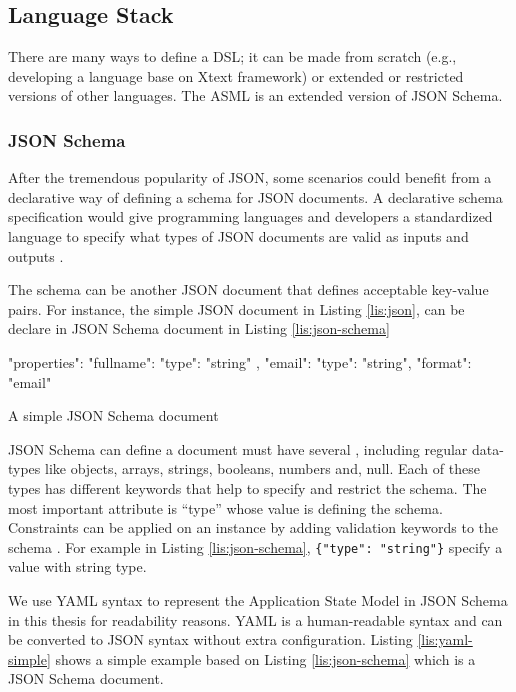 \subsection{Language Stack}
There are many ways to define a DSL; it can be made from scratch (e.g., developing a language base on Xtext framework) or extended or restricted versions of other languages. The ASML is an extended version of JSON Schema. 


\subsubsection{JSON Schema}
After the tremendous popularity of JSON, some scenarios could benefit from a declarative way of defining a schema for JSON documents.
A declarative schema specification would give programming languages and developers a standardized language to specify what types of JSON documents are valid as inputs and outputs \cite{json-schema}.

The schema can be another JSON document that defines acceptable key-value pairs.
For instance, the simple JSON document in Listing \ref{lis:json}, can be declare in JSON Schema document in Listing \ref{lis:json-schema}

\FloatBarrier
\begin{code}
\begin{json}
{
    "properties": {
        "fullname": {
            "type": "string"
        },
        "email": {
            "type": "string",
            "format": "email"
        }
    }
}
\end{json}
\caption{A simple JSON Schema document}
\label{lis:json-schema}
\end{code}
\FloatBarrier

JSON Schema can define a document must have several , including regular data-types like objects, arrays, strings, booleans, numbers and, null. Each of these types has different keywords that help to specify and restrict the schema. The most important attribute is “type” whose value is defining the schema. Constraints can be applied on an instance by adding validation keywords to the schema \cite{json-model}. For example in Listing \ref{lis:json-schema}, \lstinline[basicstyle=\ttfamily]|{"type": "string"}| specify a value with string type.

We use YAML syntax to represent the Application State Model in JSON Schema in this thesis for readability reasons. YAML is a human-readable syntax and can be converted to JSON syntax without extra configuration. Listing \ref{lis:yaml-simple} shows a simple example based on Listing \ref{lis:json-schema} which is a JSON Schema document.


